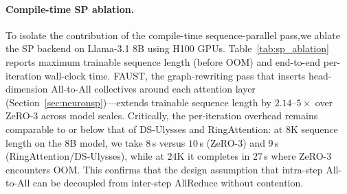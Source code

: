 \documentclass{article}
\begin{document}
\paragraph{Compile-time SP ablation.} \begin{table}
\vspace{-6pt}
\centering
\scriptsize
\setlength{\tabcolsep}{4.5pt}
\renewcommand{\arraystretch}{1.12}
\caption{Compile-time SP ablation on Llama-3.1 using H100 GPUs. Left: maximum trainable sequence length before OOM. Right: per-iteration time for the 8B model.}
\label{tab:sp_ablation}
\vspace{-8pt}
\end{table}
To isolate the contribution of the compile-time sequence-parallel pass,we ablate the SP backend
on Llama-3.1 8B using H100 GPUs.
Table~\ref{tab:sp_ablation} reports maximum trainable sequence length (before OOM) and
end-to-end per-iteration wall-clock time.
FAUST, the graph-rewriting pass that inserts head-dimension All-to-All collectives around
each attention layer (Section~\ref{sec:neuronsp})---extends trainable sequence length by
$2.14$--$5{\times}$ over ZeRO-3 across model scales.
Critically, the per-iteration overhead remains comparable to or below that of DS-Ulysses and
RingAttention: at $8$K sequence length on the 8B model, we take $8$\,s versus $10$\,s (ZeRO-3)
and $9$\,s (RingAttention/DS-Ulysses), while at $24$K it completes in $27$\,s where ZeRO-3 encounters OOM.
This confirms that the design
assumption that intra-step All-to-All can be decoupled from inter-step AllReduce
without contention.



\end{document}
